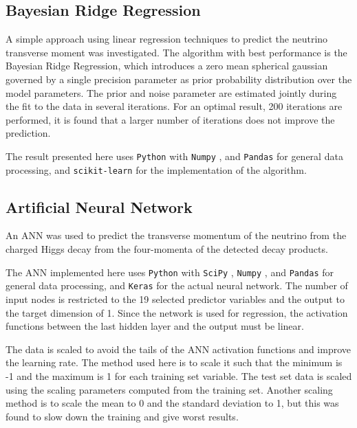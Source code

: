 \documentclass[twocolumn]{scrartcl}
\begin{document}
\subsection{Bayesian Ridge Regression}

A simple approach using linear regression techniques to predict the neutrino transverse moment was investigated. The algorithm with best performance is the Bayesian Ridge Regression, which introduces a zero mean spherical gaussian governed by a single precision parameter as prior probability distribution over the model parameters. The prior and noise parameter are estimated jointly during the fit to the data in several iterations. For an optimal result, 200 iterations are performed, it is found that a larger number of iterations does not improve the prediction.

The result presented here uses \texttt{Python} with \texttt{Numpy} \cite{numpy}, and \texttt{Pandas} \cite{pandas} for general data processing, and \texttt{scikit-learn} \cite{scikit-learn} for the implementation of the algorithm.


\subsection{Artificial Neural Network}

An \gls{ANN} was used to predict the transverse momentum of the neutrino from the charged Higgs decay from the four-momenta of the detected decay products. 

The \gls{ANN} implemented here uses \texttt{Python} with \texttt{SciPy} \cite{scipy}, \texttt{Numpy} \cite{numpy}, and \texttt{Pandas} \cite{pandas} for general data processing, and \texttt{Keras} \cite{keras} for the actual neural network. The number of input nodes is restricted to the 19 selected predictor variables and the output to the target dimension of 1. Since the network is used for regression, the activation functions between the last hidden layer and the output must be linear.

The data is scaled to avoid the tails of the \gls{ANN} activation functions and improve the learning rate. The method used here is to scale it such that the minimum is -1 and the maximum is 1 for each training set variable. The test set data is scaled using the scaling parameters computed from the training set. Another scaling method is to scale the mean to 0 and the standard deviation to 1, but this was found to slow down the training and give worst results.
\end{document}
